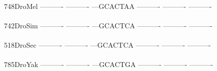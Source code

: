 \documentclass[11pt,twoside,reqno,a4paper]{article}
\begin{document}
{\\
748\hspace*{2\charwidth}DroMel	----------	----------	---GCACTAA	----------	----------	----------	\\
\hspace*{5\charwidth}\hspace*{7\charwidth}\hspace*{1\charwidth}\hspace*{1\charwidth}\hspace*{1\charwidth}\hspace*{1\charwidth}\hspace*{1\charwidth}\hspace*{1\charwidth}\\
742\hspace*{2\charwidth}DroSim	----------	----------	---GCACTCA	----------	----------	----------	\\
\hspace*{5\charwidth}\hspace*{7\charwidth}\hspace*{1\charwidth}\hspace*{1\charwidth}\hspace*{1\charwidth}\hspace*{1\charwidth}\hspace*{1\charwidth}\hspace*{1\charwidth}\\
518\hspace*{2\charwidth}DroSec	----------	----------	---GCACTCA	----------	----------	----------	\\
\hspace*{5\charwidth}\hspace*{7\charwidth}\hspace*{1\charwidth}\hspace*{1\charwidth}\hspace*{1\charwidth}\hspace*{1\charwidth}\hspace*{1\charwidth}\hspace*{1\charwidth}\\
785\hspace*{2\charwidth}DroYak	----------	----------	---GCACTGA	----------	----------	----------	\\
\hspace*{5\charwidth}\hspace*{7\charwidth}\hspace*{1\charwidth}\hspace*{1\charwidth}\hspace*{1\charwidth}\hspace*{1\charwidth}\hspace*{1\charwidth}\hspace*{1\charwidth}\\
}
\end{document}
